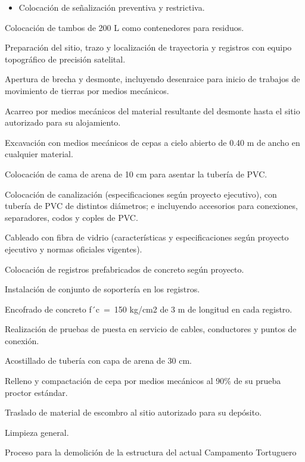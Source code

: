 \documentclass{article}
\begin{document}
\bigskip

\begin{itemize}
\item Colocación de señalización preventiva y restrictiva.
\end{itemize}
Colocación de tambos de 200 L como contenedores para residuos.

Preparación del sitio, trazo y localización de trayectoria y registros con equipo topográfico de precisión satelital.

Apertura de brecha y desmonte, incluyendo desenraice para inicio de trabajos de movimiento de tierras por medios mecánicos.

Acarreo por medios mecánicos del material resultante del desmonte hasta el sitio autorizado para su alojamiento.

Excavación con medios mecánicos de cepas a cielo abierto de 0.40 m de ancho en cualquier material.

Colocación de cama de arena de 10 cm para asentar la tubería de PVC.

Colocación de canalización (especificaciones según proyecto ejecutivo), con tubería de PVC de distintos diámetros; e incluyendo accesorios para conexiones, separadores, codos y coples de PVC.

Cableado con fibra de vidrio (características y especificaciones según proyecto ejecutivo y normas oficiales vigentes).

Colocación de registros prefabricados de concreto según proyecto.

Instalación de conjunto de soportería en los registros.

Encofrado de concreto f´c~=~150 kg/cm2 de 3 m de longitud en cada registro.

Realización de pruebas de puesta en servicio de cables, conductores y puntos de conexión.

Acostillado de tubería con capa de arena de 30 cm.

Relleno y compactación de cepa por medios mecánicos al 90\% de su prueba proctor estándar.

Traslado de material de escombro al sitio autorizado para su depósito.

Limpieza general.


\bigskip


\bigskip

Proceso para la demolición de la estructura \newline
del actual Campamento Tortuguero
\end{document}
